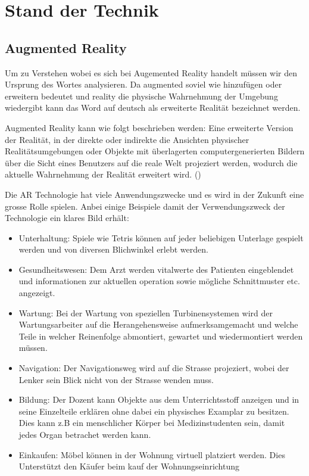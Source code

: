\section{Stand der Technik}

\subsection{Augmented Reality} \label{sub:augmented-reality}
Um zu Verstehen wobei es sich bei Augemented Reality handelt müssen wir den Ursprung des Wortes analysieren. Da augmented soviel wie hinzufügen oder erweitern bedeutet und reality die physische Wahrnehmung der Umgebung wiedergibt kann das Word auf deutsch als erweiterte Realität bezeichnet werden.

Augmented Reality kann wie folgt beschrieben werden: Eine erweiterte Version der Realität, in der direkte oder indirekte die Ansichten physischer Realitätsumgebungen oder Objekte mit überlagerten computergenerierten Bildern über die Sicht eines Benutzers auf die reale Welt projeziert werden, wodurch die aktuelle Wahrnehmung der Realität erweitert wird. (\cite{reality-technologies})

Die AR Technologie hat viele Anwendungszwecke und es wird in der Zukunft eine grosse Rolle spielen. Anbei einige Beispiele damit der Verwendungszweck der Technologie ein klares Bild erhält:
\begin{itemize}
    \item Unterhaltung: Spiele wie Tetris können auf jeder beliebigen Unterlage gespielt werden und von diversen Blichwinkel erlebt werden.
    \item Gesundheitswesen: Dem Arzt werden vitalwerte des Patienten eingeblendet und informationen zur aktuellen operation sowie mögliche Schnittmuster etc. angezeigt.
    \item Wartung: Bei der Wartung von speziellen Turbinensystemen wird der Wartungsarbeiter auf die Herangehensweise aufmerksamgemacht und welche Teile in welcher Reinenfolge abmontiert, gewartet und wiedermontiert werden müssen.
    \item Navigation: Der Navigationsweg wird auf die Strasse projeziert, wobei der Lenker sein Blick nicht von der Strasse wenden muss.
    \item Bildung: Der Dozent kann Objekte aus dem Unterrichtsstoff anzeigen und in seine Einzelteile erklären ohne dabei ein physisches Examplar zu besitzen. Dies kann z.B ein menschlicher Körper bei Medizinstudenten sein, damit jedes Organ betrachet werden kann.
    \item Einkaufen: Möbel können in der Wohnung virtuell platziert werden. Dies Unterstützt den Käufer beim kauf der Wohnungseinrichtung
\end{itemize}

